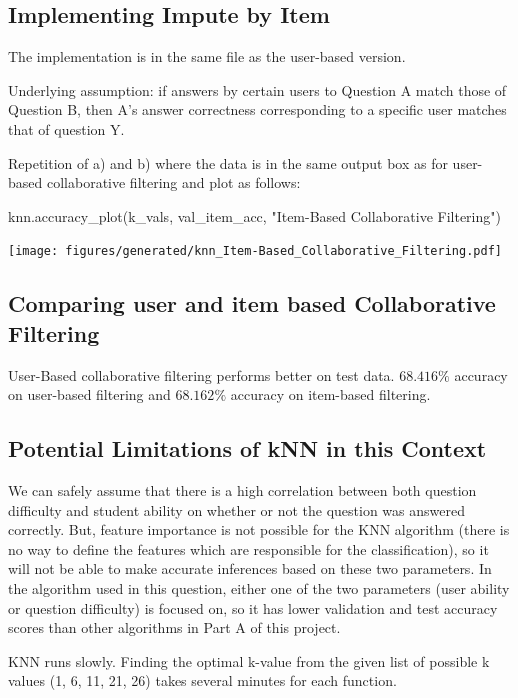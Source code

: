 \documentclass{article}
\begin{document}
    \subsection{Implementing Impute by Item}
    The implementation is in the same file as the user-based version.

    Underlying assumption: if answers by certain users to Question A match those of Question B, then A’s answer correctness corresponding to a specific user matches that of question Y. 

    Repetition of a) and b) where the data is in the same output box as for user-based collaborative filtering and plot as follows:

    \begin{pylabblock}[KNN]
        knn.accuracy_plot(k_vals, val_item_acc, "Item-Based Collaborative Filtering")
    \end{pylabblock}

    \texttt{[image: figures/generated/knn\_Item-Based\_Collaborative\_Filtering.pdf]}    

    \subsection{Comparing user and item based Collaborative Filtering}
    User-Based collaborative filtering performs better on test data. $68.416\%$ accuracy on user-based filtering and $68.162\%$ accuracy on item-based filtering.

    \subsection{Potential Limitations of kNN in this Context}
    We can safely assume that there is a high correlation between both question difficulty and student ability on whether or not the question was answered correctly. But, feature importance is not possible for the KNN algorithm (there is no way to define the features which are responsible for the classification), so it will not be able to make accurate inferences based on these two parameters. In the algorithm used in this question, either one of the two parameters (user ability or question difficulty) is focused on, so it has lower validation and test accuracy scores than other algorithms in Part A of this project. 

    KNN runs slowly. Finding the optimal k-value from the given list of possible k values ({1, 6, 11, 21, 26}) takes several minutes for each function.
\end{document}
